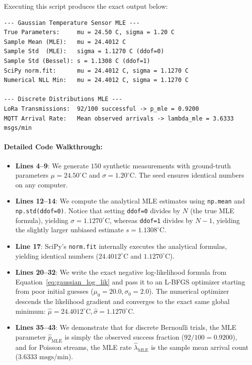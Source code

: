 Executing this script produces the exact output below:
\begin{lstlisting}[style=outputstyle]
--- Gaussian Temperature Sensor MLE ---
True Parameters:     mu = 24.50 C, sigma = 1.20 C
Sample Mean (MLE):   mu = 24.4012 C
Sample Std  (MLE):   sigma = 1.1270 C (ddof=0)
Sample Std (Bessel): s = 1.1308 C (ddof=1)
SciPy norm.fit:      mu = 24.4012 C, sigma = 1.1270 C
Numerical NLL Min:   mu = 24.4012 C, sigma = 1.1270 C

--- Discrete Distributions MLE ---
LoRa Transmissions:  92/100 successful -> p_mle = 0.9200
MQTT Arrival Rate:   Mean observed arrivals -> lambda_mle = 3.6333 msgs/min
\end{lstlisting}

\paragraph{Detailed Code Walkthrough:}
\begin{itemize}
    \item \textbf{Lines 4--9}: We generate $150$ synthetic measurements with ground-truth parameters $\mu = 24.50^\circ\text{C}$ and $\sigma = 1.20^\circ\text{C}$. The seed ensures identical numbers on any computer.
    \item \textbf{Lines 12--14}: We compute the analytical MLE estimates using \texttt{np.mean} and \texttt{np.std(ddof=0)}. Notice that setting \texttt{ddof=0} divides by $N$ (the true MLE formula), yielding $\sigma = 1.1270^\circ\text{C}$, whereas \texttt{ddof=1} divides by $N - 1$, yielding the slightly larger unbiased estimate $s = 1.1308^\circ\text{C}$.
    \item \textbf{Line 17}: SciPy's \texttt{norm.fit} internally executes the analytical formulas, yielding identical numbers ($24.4012^\circ\text{C}$ and $1.1270^\circ\text{C}$).
    \item \textbf{Lines 20--32}: We write the exact negative log-likelihood formula from Equation~\eqref{eq:gaussian_log_lik} and pass it to an L-BFGS optimizer starting from poor initial guesses ($\mu_0 = 20.0, \sigma_0 = 2.0$). The numerical optimizer descends the likelihood gradient and converges to the exact same global minimum: $\hat{\mu} = 24.4012^\circ\text{C}, \hat{\sigma} = 1.1270^\circ\text{C}$.
    \item \textbf{Lines 35--43}: We demonstrate that for discrete Bernoulli trials, the MLE parameter $\hat{p}_{\text{MLE}}$ is simply the observed success fraction ($92/100 = 0.9200$), and for Poisson streams, the MLE rate $\hat{\lambda}_{\text{MLE}}$ is the sample mean arrival count ($3.6333\text{ msgs/min}$).
\end{itemize}

